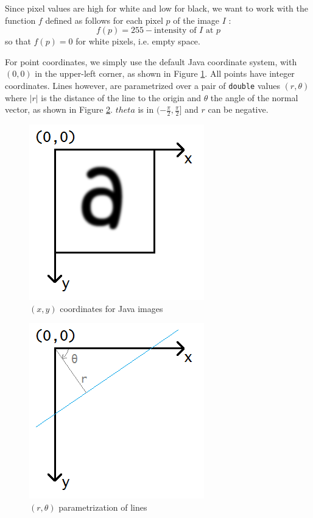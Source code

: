 \documentclass[10pt,a4paper]{article}			%
\begin{document}
Since pixel values are high for white and low for black, we want to work with the function $f$ defined as follows for each pixel $p$ of the image $I$ :
\[f(p) = 255 - \text{intensity of $I$ at $p$}\]
so that $f(p)=0$ for white pixels, i.e. empty space.

For point coordinates, we simply use the default Java coordinate system, with $(0,0)$ in the upper-left corner, as shown in Figure \ref{coordinates}. All points have integer coordinates. Lines however, are parametrized over a pair of \texttt{double} values $(r,\theta)$ where $|r|$ is the distance of the line to the origin and $\theta$ the angle of the normal vector, as shown in Figure \ref{lines_parametrization}. $theta$ is in $(-\frac{\pi}{2},\frac{\pi}{2}]$ and $r$ can be negative.
\begin{figure}[h]
\includegraphics[scale=0.5]{img/coordinates.png}
\caption{$(x,y)$ coordinates for Java images}
\label{coordinates}
\end{figure}
\begin{figure}[h]
\includegraphics[scale=0.7]{img/lines.png}
\caption{$(r,\theta)$ parametrization of lines}
\label{lines_parametrization}
\end{figure}
\end{document}
